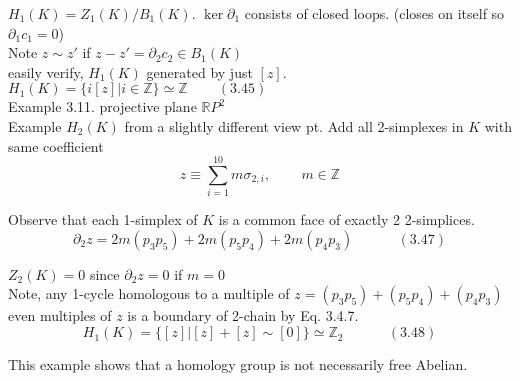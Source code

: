 \documentclass{book}
\begin{document}
$H_1(K) = Z_1(K)/B_1(K)$.  $\ker{\partial_1}$ consists of closed loops. (closes on itself so $\partial_1 c_1 =0$) \\

Note $z \sim z'$ if $z - z' = \partial_2 c_2 \in B_1(K)$ \\
easily verify, $H_1(K)$ generated by just $[z]$.  $H_1(K) = \lbrace i [z] | i \in \mathbb{Z} \rbrace \simeq \mathbb{Z} \quad \quad \, (3.45)$ \\

Example 3.11. projective plane $\mathbb{R}P^2$ \\
 
Example $H_2(K)$ from a slightly different view pt.  Add all 2-simplexes in $K$ with same coefficient
\[
z \equiv \sum_{i=1}^{10} m \sigma_{2,i}, \quad \quad \, m \in \mathbb{Z}
\]

Observe that each 1-simplex of $K$ is a common face of exactly 2 2-simplices.  
\begin{equation}
  \partial_2 z = 2m (p_3 p_5) + 2m (p_5 p_4) + 2m (p_4 p_3) \quad \quad \quad \, (3.47)
\end{equation}

$Z_2(K) =0$ since $\partial_2 z = 0$ if $m=0$ \\
Note, any 1-cycle homologous to a multiple of $z = (p_3 p_5) + (p_5 p_4) + (p_4 p_3)$ \\
even multiples of $z$ is a boundary of 2-chain by Eq. 3.4.7.  
\begin{equation}
  H_1(K) = \lbrace [z] | [z] + [z] \sim [0] \rbrace \simeq \mathbb{Z}_2 \quad \quad \quad \, (3.48)
\end{equation}

This example shows that a homology group is not necessarily free Abelian.   \\
\end{document}
